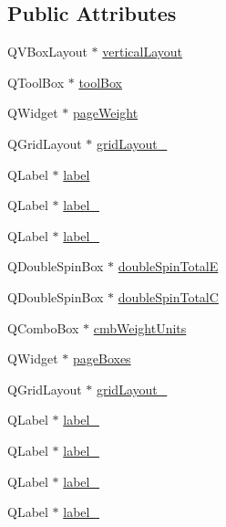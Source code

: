 \subsection*{Public Attributes}
\begin{DoxyCompactItemize}
\item 
QVBoxLayout $\ast$ \hyperlink{class_ui___catch_input_ctrl_a9561b6529376d26e0ccb20cc6c14b250}{verticalLayout}
\item 
QToolBox $\ast$ \hyperlink{class_ui___catch_input_ctrl_a400cc2815d260b0d5a2002e0f3930624}{toolBox}
\item 
QWidget $\ast$ \hyperlink{class_ui___catch_input_ctrl_a9537a8bca138a8be186818857687c60b}{pageWeight}
\item 
QGridLayout $\ast$ \hyperlink{class_ui___catch_input_ctrl_a9100755b8172afb9af709d31006d35ca}{gridLayout\_}
\item 
QLabel $\ast$ \hyperlink{class_ui___catch_input_ctrl_a749bd3c4cfc56b285f3433a29fbd7f4f}{label}
\item 
QLabel $\ast$ \hyperlink{class_ui___catch_input_ctrl_afc6d97fb8770eb2a9b8c12e0c8b3e8ab}{label\_}
\item 
QLabel $\ast$ \hyperlink{class_ui___catch_input_ctrl_a7dfdb06aa7352b97b76fd6c46d1bf409}{label\_}
\item 
QDoubleSpinBox $\ast$ \hyperlink{class_ui___catch_input_ctrl_a78f71e94d3f0fa1afb22097a90f9c32c}{doubleSpinTotalE}
\item 
QDoubleSpinBox $\ast$ \hyperlink{class_ui___catch_input_ctrl_aff17e56983eb8a28a43bee32c447cbc9}{doubleSpinTotalC}
\item 
QComboBox $\ast$ \hyperlink{class_ui___catch_input_ctrl_ac34db8d516987f86bab23d83c406fd8c}{cmbWeightUnits}
\item 
QWidget $\ast$ \hyperlink{class_ui___catch_input_ctrl_ae3a68f52213e0032bdc63a85d983e78f}{pageBoxes}
\item 
QGridLayout $\ast$ \hyperlink{class_ui___catch_input_ctrl_af1f917ff0f390f088908fd7f1d476b98}{gridLayout\_}
\item 
QLabel $\ast$ \hyperlink{class_ui___catch_input_ctrl_a5a44fb5339f63d2428392e01c5218679}{label\_}
\item 
QLabel $\ast$ \hyperlink{class_ui___catch_input_ctrl_a360c2f2b5fa15408bcb206816a0ea865}{label\_}
\item 
QLabel $\ast$ \hyperlink{class_ui___catch_input_ctrl_a022e39dbe397e76af5c51d2c7c17934b}{label\_}
\item 
QLabel $\ast$ \hyperlink{class_ui___catch_input_ctrl_a2b0edb00030f14ac2c6fee7de386b5d9}{label\_}

\end{DoxyCompactItemize}
